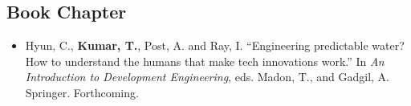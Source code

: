 \documentclass[11pt]{article}
\begin{document}
	


\subsection*{Book Chapter}
\begin{itemize}
	\item[]Hyun, C., \textbf{Kumar, T.}, Post, A. and Ray, I. ``Engineering predictable water? How to understand the humans that make tech innovations work.'' In \textit{An Introduction to Development Engineering}, eds. Madon, T., and Gadgil, A. Springer. Forthcoming.


	\end{itemize}
	
\end{document}
